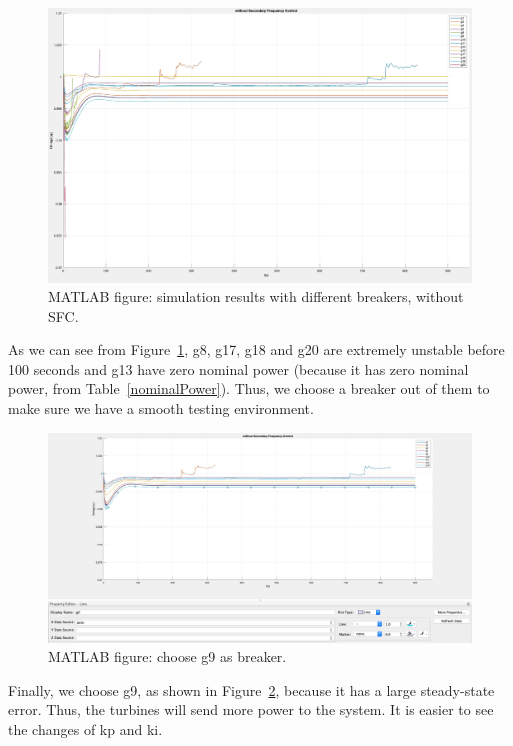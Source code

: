\begin{figure}[htbp]
\centering
\includegraphics[width = .891\textwidth]{figure/4_1_1_without1.jpeg}
\caption{MATLAB figure: simulation results with different breakers, without SFC.}
\label{4_1_1_without1}
\end{figure}

As we can see from Figure~\ref{4_1_1_without1}, g8, g17, g18 and g20 are extremely unstable before 100 seconds and g13 have zero nominal power (because it has zero nominal power, from Table~\ref{nominalPower}). Thus, we choose a breaker out of them to make sure we have a smooth testing environment.\\


\begin{figure}[htbp]
\centering
\includegraphics[width = .891\textwidth]{figure/4_1_1_without2.jpeg}
\caption{MATLAB figure: choose g9 as breaker.}
\label{4_1_1_without2}
\end{figure}

Finally, we choose g9, as shown in Figure~\ref{4_1_1_without2}, because it has a large steady-state error. Thus, the turbines will send more power to the system. It is easier to see the changes of kp and ki.\\

